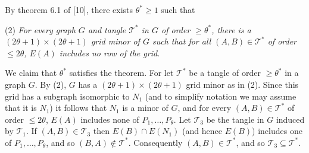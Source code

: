 By theorem 6.1 of [10], there exists $\theta^* \ge 1$ such that

\hspace*{12pt}(2) \textit{For every graph $G$ and tangle $\mathscr{T}^*$ in $G$ of order $\ge \theta^*$, there is a $(2\theta + 1) \times (2\theta + 1)$ grid minor of $G$ such that for all $(A, B) \in \mathscr{T}^*$ of order $\le 2\theta$, $E(A)$ includes no row of the grid.}

We claim that $\theta^*$ satisfies the theorem. For let $\mathscr{T}^*$ be a tangle of order $\ge \theta^*$ in a graph $G$. By (2), $G$ has a $(2\theta + 1) \times (2\theta + 1)$ grid minor as in (2). Since this grid has a subgraph isomorphic to $N_1$ (and to simplify notation we may assume that it is $N_1$) it follows that $N_1$ is a minor of $G$, and for every $(A, B) \in \mathscr{T}^*$ of order $\le 2\theta$, $E(A)$ includes none of $P_1, \dots, P_\theta$. Let $\mathscr{T}_3$ be the tangle in $G$ induced by $\mathscr{T}_1$. If $(A, B) \in \mathscr{T}_3$ then $E(B) \cap E(N_1)$ (and hence $E(B)$) includes one of $P_1, \dots, P_\theta$, and so $(B, A) \notin \mathscr{T}^*$. Consequently $(A, B) \in \mathscr{T}^*$, and so $\mathscr{T}_3 \subseteq \mathscr{T}^*$.
